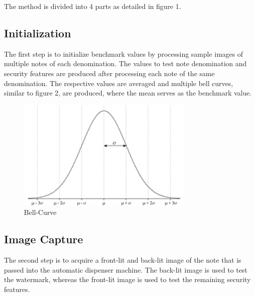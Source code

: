 \documentclass{article}
\begin{document}
The method is divided into 4 parts as detailed in figure 1.

\subsection{Initialization}
The first step is to initialize benchmark values by processing sample images of multiple notes of each denomination. The values to test note denomination and security features are produced after processing each note of the same denomination. The respective values are averaged and multiple bell curves, similar to figure 2, are produced, where the mean serves as the benchmark value.

\begin{figure}[ht]

\begin{minipage}[b]{1.0\linewidth}
  \centering
  \centerline{\includegraphics[width=8.5cm]{bell_curve.png}}
  \vspace{-3mm}
\end{minipage}
%
\caption{Bell-Curve}
\label{fig:bellcurve}
\vspace{-3mm}
\end{figure}

\newpage

\subsection{Image Capture}
The second step is to acquire a front-lit and back-lit image of the note that is passed into the automatic dispenser machine. The back-lit image is used to test the watermark, whereas the front-lit image is used to test the remaining security features. 
\end{document}
